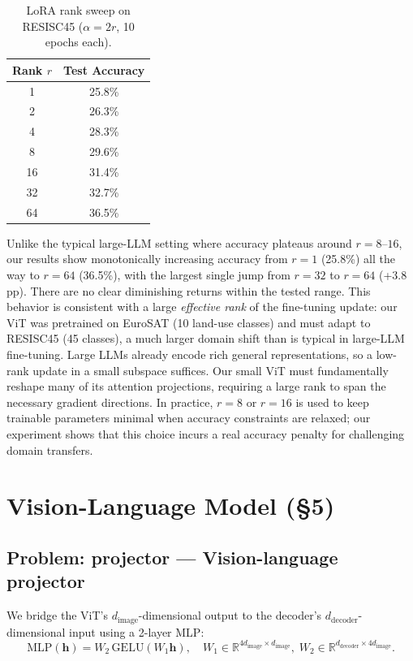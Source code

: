 \documentclass[11pt]{article}
\begin{document}
\begin{table}[H]
\centering
\caption{LoRA rank sweep on RESISC45 ($\alpha = 2r$, 10 epochs each).}
\begin{tabular}{cc}
\toprule
Rank $r$ & Test Accuracy \\
\midrule
1  & 25.8\% \\
2  & 26.3\% \\
4  & 28.3\% \\
8  & 29.6\% \\
16 & 31.4\% \\
32 & 32.7\% \\
64 & 36.5\% \\
\bottomrule
\end{tabular}
\end{table}

Unlike the typical large-LLM setting where accuracy plateaus around
$r = 8$--$16$, our results show monotonically increasing accuracy from
$r=1$ (25.8\%) all the way to $r=64$ (36.5\%), with the largest single
jump from $r=32$ to $r=64$ (+3.8 pp).  There are no clear diminishing
returns within the tested range. This behavior is consistent with a large
\emph{effective rank} of the fine-tuning update: our ViT was pretrained
on EuroSAT (10 land-use classes) and must adapt to RESISC45 (45 classes),
a much larger domain shift than is typical in large-LLM fine-tuning.
Large LLMs already encode rich general representations, so a low-rank
update in a small subspace suffices.  Our small ViT must fundamentally
reshape many of its attention projections, requiring a large rank to span
the necessary gradient directions.  In practice, $r = 8$ or $r = 16$
is used to keep trainable parameters minimal when accuracy constraints are
relaxed; our experiment shows that this choice incurs a real accuracy
penalty for challenging domain transfers.

\section{Vision-Language Model (\S{}5)}

\subsection*{Problem: projector --- Vision-language projector}

We bridge the ViT's $d_{\mathrm{image}}$-dimensional output to the decoder's
$d_{\mathrm{decoder}}$-dimensional input using a 2-layer MLP:
\[
  \mathrm{MLP}(\mathbf{h}) = W_2\,\mathrm{GELU}(W_1 \mathbf{h}),
  \quad W_1 \in \mathbb{R}^{4d_{\mathrm{image}}\times d_{\mathrm{image}}},\;
  W_2 \in \mathbb{R}^{d_{\mathrm{decoder}}\times 4d_{\mathrm{image}}}.
\]
\end{document}
